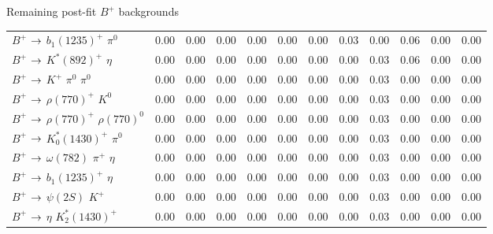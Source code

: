 \documentclass[xcolor=dvipsnames]{beamer}
\begin{document}
\begin{frame}{Remaining post-fit $B^+$ backgrounds}
{\begin{tabular}{lrrrrrrrrrrr}
      $B^{+}$ $\rightarrow$ $b_{1}(1235)^{+}$ $\pi^{0}$                            &         0.00 &         0.00 &         0.00 &         0.00 &         0.00 &         0.00 &         0.03 &         0.00 &         0.06 &         0.00 &         0.00 \\
      $B^{+}$ $\rightarrow$ $K^{*}(892)^{+}$ $\eta$                                &         0.00 &         0.00 &         0.00 &         0.00 &         0.00 &         0.00 &         0.00 &         0.03 &         0.06 &         0.00 &         0.00 \\
      $B^{+}$ $\rightarrow$ $K^{+}$ $\pi^{0}$ $\pi^{0}$                            &         0.00 &         0.00 &         0.00 &         0.00 &         0.00 &         0.00 &         0.00 &         0.03 &         0.00 &         0.00 &         0.00 \\
      $B^{+}$ $\rightarrow$ $\rho(770)^{+}$ $K^{0}$                                &         0.00 &         0.00 &         0.00 &         0.00 &         0.00 &         0.00 &         0.00 &         0.03 &         0.00 &         0.00 &         0.00 \\
      $B^{+}$ $\rightarrow$ $\rho(770)^{+}$ $\rho(770)^{0}$                        &         0.00 &         0.00 &         0.00 &         0.00 &         0.00 &         0.00 &         0.00 &         0.03 &         0.00 &         0.00 &         0.00 \\
      $B^{+}$ $\rightarrow$ $K_{0}^{*}(1430)^{+}$ $\pi^{0}$                        &         0.00 &         0.00 &         0.00 &         0.00 &         0.00 &         0.00 &         0.00 &         0.03 &         0.00 &         0.00 &         0.00 \\
      $B^{+}$ $\rightarrow$ $\omega(782)$ $\pi^{+}$ $\eta$                         &         0.00 &         0.00 &         0.00 &         0.00 &         0.00 &         0.00 &         0.00 &         0.03 &         0.00 &         0.00 &         0.00 \\
      $B^{+}$ $\rightarrow$ $b_{1}(1235)^{+}$ $\eta$                               &         0.00 &         0.00 &         0.00 &         0.00 &         0.00 &         0.00 &         0.00 &         0.03 &         0.00 &         0.00 &         0.00 \\
      $B^{+}$ $\rightarrow$ $\psi(2S)$ $K^{+}$                                     &         0.00 &         0.00 &         0.00 &         0.00 &         0.00 &         0.00 &         0.00 &         0.03 &         0.00 &         0.00 &         0.00 \\
      $B^{+}$ $\rightarrow$ $\eta$ $K_{2}^{*}(1430)^{+}$                           &         0.00 &         0.00 &         0.00 &         0.00 &         0.00 &         0.00 &         0.00 &         0.03 &         0.00 &         0.00 &         0.00 \\

\end{tabular}}
\end{frame}
\end{document}
